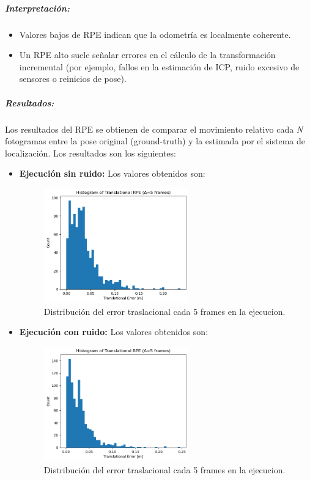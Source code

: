 \documentclass[12pt, a4paper, twoside]{article}
\begin{document}
\subparagraph{Interpretación:}
\begin{itemize}
  \item Valores bajos de RPE\cite{Sturm2012RPE} indican que la odometría es localmente coherente.
  \item Un RPE\cite{Sturm2012RPE} alto suele señalar errores en el cálculo de la transformación incremental 
  (por ejemplo, fallos en la estimación de ICP, ruido excesivo de sensores o reinicios de pose).
\end{itemize}

\subparagraph{Resultados:}
Los resultados del RPE\cite{Sturm2012RPE} se obtienen de comparar el movimiento relativo cada \textit{N} fotogramas entre la pose original (ground-truth) y la estimada por el sistema de localización. 
Los resultados son los siguientes:\newpage
\begin{itemize} 
  \item \textbf{Ejecución sin ruido:} Los valores obtenidos son: \newline

  \begin{figure}[h]
    \centering
      \includegraphics[width=0.59\textwidth]{rpe_clean.png}
    \caption{Distribución del error traslacional cada 5 frames en la ejecucion.}
  \end{figure} 
  \item \textbf{Ejecución con ruido:} Los valores obtenidos son: \newline
  \begin{figure}[h]
    \centering
      \includegraphics[width=0.59\textwidth]{rpe_noisy.png}
    \caption{Distribución del error traslacional cada 5 frames en la ejecucion.}
  \end{figure} 

\end{itemize}
\end{document}
